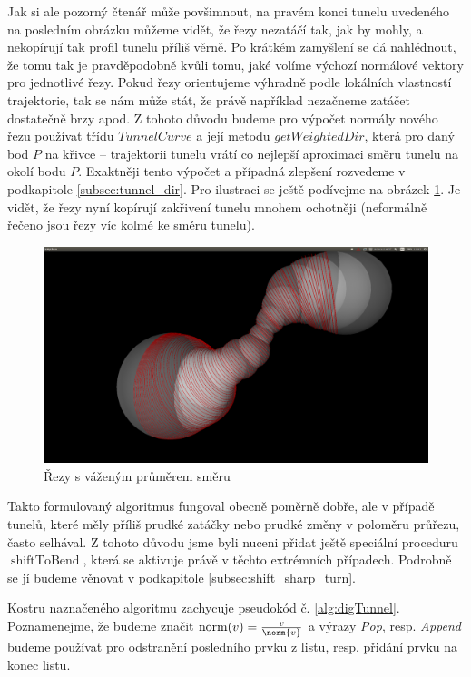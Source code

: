 Jak si ale pozorný čtenář může povšimnout, na pravém konci tunelu uvedeného na
posledním obrázku můžeme vidět, že řezy nezatáčí tak, jak by mohly, a nekopírují tak
profil tunelu příliš věrně. Po krátkém zamyšlení se dá nahlédnout, že tomu tak
je pravděpodobně kvůli tomu, jaké volíme výchozí normálové vektory pro jednotlivé
řezy. Pokud řezy orientujeme výhradně podle lokálních vlastností trajektorie,
tak se nám může stát, že právě například nezačneme zatáčet dostatečně brzy apod.
Z tohoto důvodu budeme pro výpočet normály nového řezu používat třídu
$ TunnelCurve $ a její metodu $ getWeightedDir $, která pro daný bod $ P $ na křivce
– trajektorii tunelu vrátí co nejlepší aproximaci směru tunelu na okolí bodu $ P $.
Exaktněji tento výpočet a případná zlepšení rozvedeme v podkapitole \ref{subsec:tunnel_dir}.
Pro ilustraci se ještě podívejme na obrázek \ref{fig:weighted_dir}. Je vidět, že
řezy nyní kopírují zakřivení tunelu mnohem ochotněji (neformálně řečeno jsou řezy
víc kolmé ke směru tunelu).

\begin{figure}[ht]
    \centering
    \includegraphics[width=\textwidth]{img/weighted_dir.png}
    \caption{Řezy s váženým průměrem směru}
  \centering
  \label{fig:weighted_dir}
\end{figure}

Takto formulovaný algoritmus fungoval obecně poměrně dobře, ale v případě tunelů,
které měly příliš prudké zatáčky nebo prudké změny v poloměru průřezu, často
selhával. Z tohoto důvodu jsme byli nuceni přidat ještě speciální proceduru
$ \operatorname{shiftToBend} $, která se aktivuje právě v těchto extrémních
případech. Podrobně se jí budeme věnovat v podkapitole \ref{subsec:shift_sharp_turn}.

Kostru naznačeného algoritmu zachycuje pseudokód č. \ref{alg:digTunnel}.
Poznamenejme, že budeme značit $ \operatorname{norm}(v) = \frac{v}{\norm{v}}$ a
výrazy \textit{Pop}, resp. \textit{Append} budeme používat pro odstranění
posledního prvku z listu, resp. přidání prvku na konec listu.

